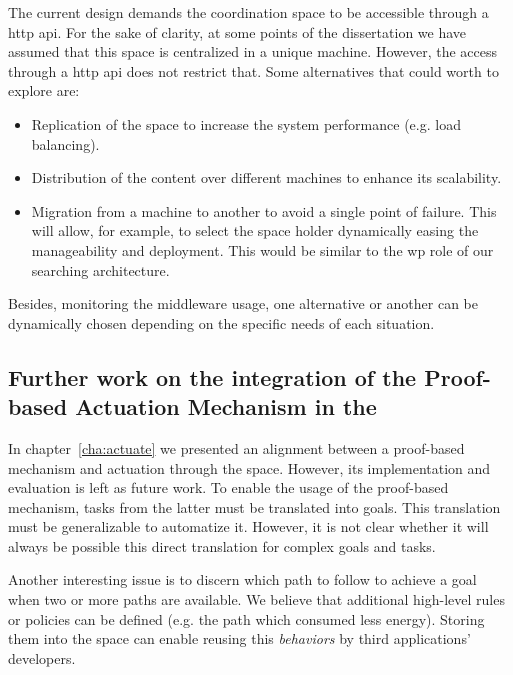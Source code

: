The current design demands the coordination space to be accessible through a \ac{http} \ac{api}.
For the sake of clarity, at some points of the dissertation we have assumed that this space is centralized in a unique machine.
However, the access through a \ac{http} \ac{api} does not restrict that.
Some alternatives that could worth to explore are: %
\begin{itemize}
  \item Replication of the space to increase the system performance (e.g. load balancing).
  \item Distribution of the content over different machines to enhance its scalability. %
  \item Migration from a machine to another to avoid a single point of failure.
        This will allow, for example, to select the space holder dynamically easing the manageability and deployment.
        This would be similar to the \ac{wp} role of our searching architecture. %
\end{itemize}

Besides, monitoring the middleware usage, one alternative or another can be dynamically chosen depending on the specific needs of each situation.


\subsection{Further work on the integration of the Proof-based Actuation Mechanism in the \Space{}}

In chapter~\ref{cha:actuate} we presented an alignment between a proof-based mechanism and actuation through the space.
However, its implementation and evaluation is left as future work.
To enable the usage of the proof-based mechanism, tasks from the latter must be translated into goals.
This translation must be generalizable to automatize it.
However, it is not clear whether it will always be possible this direct translation for complex goals and tasks.


Another interesting issue is to discern which path to follow to achieve a goal when two or more paths are available.
We believe that additional high-level rules or policies can be defined (e.g. the path which consumed less energy).
Storing them into the space can enable reusing this \emph{behaviors} by third applications' developers.


